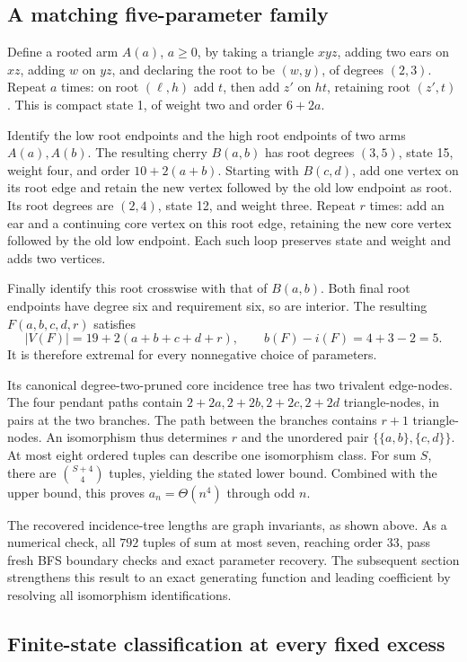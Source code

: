 \subsection{A matching five-parameter family}

Define a rooted arm $A(a)$, $a\ge0$, by taking a triangle $xyz$,
adding two ears on $xz$, adding $w$ on $yz$, and declaring the root
to be $(w,y)$, of degrees $(2,3)$.  Repeat $a$ times: on root
$(\ell,h)$ add $t$, then add $z'$ on $ht$, retaining root $(z',t)$.
This is compact state 1, of weight two and order $6+2a$.

Identify the low root endpoints and the high root endpoints of two
arms $A(a),A(b)$.  The resulting cherry $B(a,b)$ has root degrees
$(3,5)$, state 15, weight four, and order $10+2(a+b)$.
Starting with $B(c,d)$, add one vertex on its root edge and retain
the new vertex followed by the old low endpoint as root.  Its root
degrees are $(2,4)$, state 12, and weight three.  Repeat $r$ times:
add an ear and a continuing core vertex on this root edge, retaining
the new core vertex followed by the old low endpoint.  Each such
loop preserves state and weight and adds two vertices.

Finally identify this root crosswise with that of $B(a,b)$.  Both
final root endpoints have degree six and requirement six, so are
interior.  The resulting $F(a,b,c,d,r)$ satisfies
\[
 |V(F)|=19+2(a+b+c+d+r),\qquad b(F)-i(F)=4+3-2=5.
\]
It is therefore extremal for every nonnegative choice of parameters.

Its canonical degree-two-pruned core incidence tree has two trivalent
edge-nodes.  The four pendant paths contain $2+2a,2+2b,2+2c,2+2d$
triangle-nodes, in pairs at the two branches.  The path between the
branches contains $r+1$ triangle-nodes.  An isomorphism thus
determines $r$ and the unordered pair $\{\{a,b\},\{c,d\}\}$.  At
most eight ordered tuples can describe one isomorphism class.
For sum $S$, there are $\binom{S+4}{4}$ tuples, yielding the stated
lower bound.  Combined with the upper bound, this proves
$a_n=\Theta(n^4)$ through odd $n$.

The recovered incidence-tree lengths are graph invariants, as
shown above.  As a numerical check, all $792$
tuples of sum at most seven, reaching order 33, pass fresh BFS
boundary checks and exact parameter recovery.  The subsequent section
strengthens this result to an exact generating function and leading
coefficient by resolving all isomorphism identifications.

\subsection{Finite-state classification at every fixed excess}

